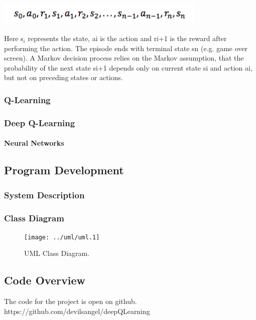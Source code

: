 \documentclass[a4paper,11pt]{article}
\begin{document}
				\begin{centering}
				\includegraphics[width=10cm]{../Design/images/mdp2.png}\\
				\end{centering}

				Here s$_{i}$ represents the state, ai is the action and ri+1 is the reward after performing the action. The episode ends with terminal state sn (e.g. game over screen). A Markov decision process relies on the Markov assumption, that the probability of the next state si+1 depends only on current state si and action ai, but not on preceding states or actions.
			\subsubsection{Q-Learning}
			\subsubsection{Deep Q-Learning}
				\paragraph{Neural Networks}

		\subsection{Program Development}
			\subsubsection{System Description}
			\subsubsection{Class Diagram}
				\begin{figure}[!h]
					\begin{centering}
						\texttt{[image: ../uml/uml.1]}
						\caption{UML Class Diagram.}
					\end{centering}
				\end{figure}

		\subsection{Code Overview}
			The code for the project is open on github. https://github.com/devilsangel/deepQLearning
\end{document}
